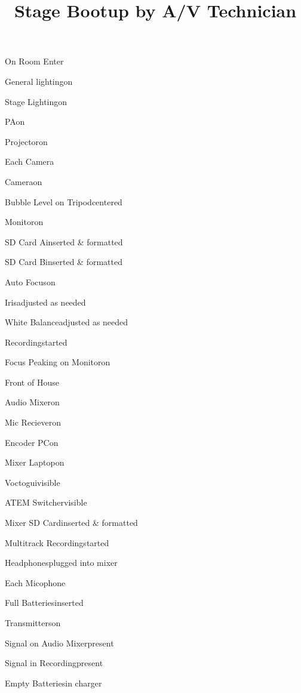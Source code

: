 \def\papersize{4}




\title{Stage Bootup by A/V Technician}

\begin{checklist}{On Room Enter}
  \item{General lighting}{on}
  \item{Stage Lighting}{on}
  \item{PA}{on}
  \item{Projector}{on}
\end{checklist}

\begin{checklist}{Each Camera}
  \item{Camera}{on}
  \item{Bubble Level on Tripod}{centered}
  \item{Monitor}{on}
  \item{SD Card A}{inserted \& formatted}
  \item{SD Card B}{inserted \& formatted}
  \item{Auto Focus}{on}
  \item{Iris}{adjusted as needed}
  \item{White Balance}{adjusted as needed}
  \item{Recording}{started}
  \item{Focus Peaking on Monitor}{on}
\end{checklist}

\begin{checklist}{Front of House}
  \item{Audio Mixer}{on}
  \item{Mic Reciever}{on}
  \item{Encoder PC}{on}
  \item{Mixer Laptop}{on}
  \item{Voctogui}{visible}
  \item{ATEM Switcher}{visible}
  \item{Mixer SD Card}{inserted \& formatted}
  \item{Multitrack Recording}{started}
  \item{Headphones}{plugged into mixer}
\end{checklist}

\begin{checklist}{Each Micophone}
  \item{Full Batteries}{inserted}
  \item{Transmitters}{on}
  \item{Signal on Audio Mixer}{present}
  \item{Signal in Recording}{present}
  \item{Empty Batteries}{in charger}
\end{checklist}

